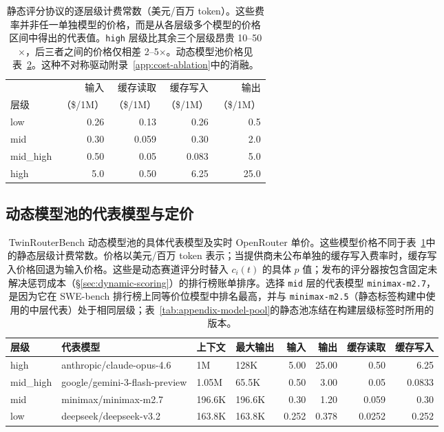 \begin{table}[ht]
\centering
\small
\begin{tabular}{lrrrr}
\toprule
 & 输入 & 缓存读取 & 缓存写入 & 输出 \\
层级 & （\$/1M） & （\$/1M） & （\$/1M） & （\$/1M） \\
\midrule
low & 0.26 & 0.13 & 0.26 & 0.5 \\
mid & 0.30 & 0.059 & 0.30 & 2.0 \\
mid\_high & 0.50 & 0.05 & 0.083 & 5.0 \\
high & 5.0 & 0.50 & 6.25 & 25.0 \\
\bottomrule
\end{tabular}
\caption{静态评分协议的逐层级计费常数（美元/百万 token）。这些费率并非任一单独模型的价格，而是从各层级多个模型的价格区间中得出的代表值。\texttt{high} 层级比其余三个层级昂贵 10--50$\times$，后三者之间的价格仅相差 2--5$\times$。动态模型池价格见表~\ref{tab:appendix-pricing}。这种不对称驱动附录~\ref{app:cost-ablation}中的消融。}
\label{tab:pricing}
\end{table}

\subsection{动态模型池的代表模型与定价}
\label{app:pricing}

\begin{table}[ht]
\centering
\small
\caption{TwinRouterBench 动态模型池的具体代表模型及实时 OpenRouter 单价。这些模型价格不同于表~\ref{tab:pricing}中的静态层级计费常数。价格以美元/百万 token 表示；当提供商未公布单独的缓存写入费率时，缓存写入价格回退为输入价格。这些是动态赛道评分时替入 $c_i(t)$ 的具体 $p$ 值；发布的评分器按包含固定未解决惩罚成本（\S\ref{sec:dynamic-scoring}）的排行榜账单排序。选择 \texttt{mid} 层的代表模型 \texttt{minimax-m2.7}，是因为它在 SWE-bench 排行榜上同等价位模型中排名最高，并与 \texttt{minimax-m2.5}（静态标签构建中使用的中层代表）处于相同层级；表~\ref{tab:appendix-model-pool}的静态池冻结在构建层级标签时所用的版本。}
\label{tab:appendix-pricing}
\begin{adjustbox}{max width=\linewidth}
\begin{tabular}{llllrrrr}
\toprule
层级 & 代表模型 & 上下文 & 最大输出 & 输入 & 输出 & 缓存读取 & 缓存写入 \\
\midrule
high     & anthropic/claude-opus-4.6       & 1M      & 128K   & 5.00  & 25.00 & 0.50   & 6.25  \\
mid\_high & google/gemini-3-flash-preview  & 1.05M   & 65.5K  & 0.50  &  3.00 & 0.05   & 0.0833 \\
mid      & minimax/minimax-m2.7             & 196.6K  & 196.6K & 0.30  &  1.20 & 0.059  & 0.30  \\
low      & deepseek/deepseek-v3.2           & 163.8K  & 163.8K & 0.252 &  0.378 & 0.0252 & 0.252 \\
\bottomrule
\end{tabular}
\end{adjustbox}
\end{table}

